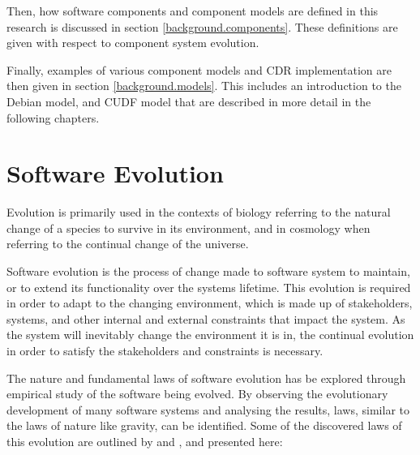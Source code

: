 Then, how software components and component models are defined in this research is discussed in section \ref{background.components}.
These definitions are given with respect to component system evolution.

Finally, examples of various component models and CDR implementation are then given in section \ref{background.models}.
This includes an introduction to the Debian model, and CUDF model that are described in more detail in the following chapters.

\section{Software Evolution}
\label{background.evolution}
Evolution is primarily used in the contexts of biology referring to the natural change of a species to survive in its environment,
and in cosmology when referring to the continual change of the universe.

Software evolution is the process of change made to software system to maintain, or to extend its functionality over the systems lifetime.
This evolution is required in order to adapt to the changing environment, which is made up of stakeholders, systems, and other internal and external constraints that impact the system. 
As the system will inevitably change the environment it is in, the continual evolution in order to satisfy the stakeholders and constraints is necessary. 

The nature and fundamental laws of software evolution has be explored through empirical study of the software being evolved.
By observing the evolutionary development of many software systems and analysing the results, laws, similar to the laws of nature like gravity, can be identified.
Some of the discovered laws of this evolution are outlined by \cite{lehman1980} and \cite{lehman1997}, and presented here:

